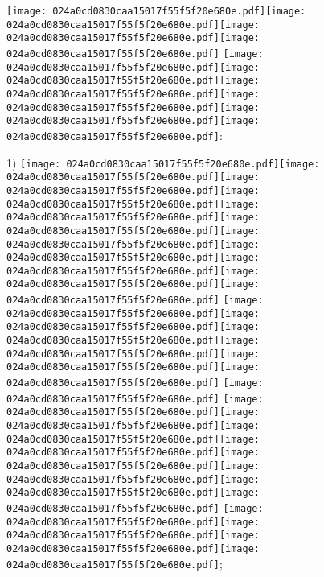 \documentclass{article}
\newcommand{\origpg}[2]{\texttt{[image: 024a0cd0830caa15017f55f5f20e680e.pdf]}}
\begin{document}
{\vspace{0.646pt}\origpg5{85.303pt 635.18pt 93.518pt 651.32pt}\origpg5{93.518pt 635.18pt 101.14pt 651.32pt}\hspace{-0.42pt}\origpg5{100.72pt 635.18pt 108.79pt 651.32pt}\hspace{-0.355pt}\origpg5{108.43pt 635.18pt 116.5pt 651.32pt} \origpg5{120.47pt 635.18pt 127.4pt 651.32pt}\origpg5{127.45pt 635.18pt 134.5pt 651.32pt}\hspace{0.161pt}\origpg5{134.66pt 635.18pt 141.83pt 651.32pt}\hspace{-0.178pt}\origpg5{141.65pt 635.18pt 150.28pt 651.32pt}\origpg5{150.28pt 635.18pt 158.35pt 651.32pt}\origpg5{158.27pt 635.18pt 165.89pt 651.32pt}\hspace{0.159pt}: 

\vspace{8.576pt}\hspace{18.094pt}1) \origpg5{121.46pt 607.24pt 133.12pt 623.38pt}\origpg5{133.02pt 607.24pt 140.19pt 623.38pt}\hspace{-0.178pt}\origpg5{140.01pt 607.24pt 148.08pt 623.38pt}\origpg5{148.18pt 607.24pt 155.34pt 623.38pt}\hspace{-0.178pt}\origpg5{155.16pt 607.24pt 165.38pt 623.38pt}\origpg5{165.28pt 607.24pt 172.45pt 623.38pt}\hspace{-0.178pt}\origpg5{172.27pt 607.24pt 184.7pt 623.38pt}\origpg5{184.78pt 607.24pt 191.95pt 623.38pt}\hspace{-0.178pt}\origpg5{191.77pt 607.24pt 200.41pt 623.38pt}\origpg5{200.41pt 607.24pt 209.04pt 623.38pt}\origpg5{209.11pt 607.24pt 216.27pt 623.38pt} \origpg5{220.18pt 607.24pt 228.3pt 623.38pt}\origpg5{228.34pt 607.24pt 235.51pt 623.38pt}\origpg5{235.56pt 607.24pt 242.73pt 623.38pt}\origpg5{242.77pt 607.24pt 249.83pt 623.38pt}\origpg5{249.76pt 607.24pt 258.4pt 623.38pt}\origpg5{258.4pt 607.24pt 267.03pt 623.38pt} \origpg5{270.96pt 607.24pt 278.57pt 623.38pt} \origpg5{282.51pt 607.24pt 289.68pt 623.38pt}\origpg5{289.73pt 607.24pt 297.8pt 623.38pt}\hspace{0.339pt}\origpg5{298.14pt 607.24pt 305.3pt 623.38pt}\hspace{0.291pt}\origpg5{305.59pt 607.24pt 312.76pt 623.38pt}\hspace{-0.42pt}\origpg5{312.34pt 607.24pt 320.55pt 623.38pt}\origpg5{320.55pt 607.24pt 329.19pt 623.38pt}\origpg5{329.19pt 607.24pt 337.82pt 623.38pt}\origpg5{337.86pt 607.24pt 345.02pt 623.38pt} \origpg5{348.93pt 607.24pt 357pt 623.38pt}\hspace{-0.355pt}\origpg5{356.64pt 607.24pt 363.02pt 623.38pt}\hspace{0.113pt}\origpg5{363.13pt 607.24pt 371.19pt 623.38pt}\origpg5{371.09pt 607.24pt 381.94pt 623.38pt}\hspace{0.272pt}; 

}
\end{document}
